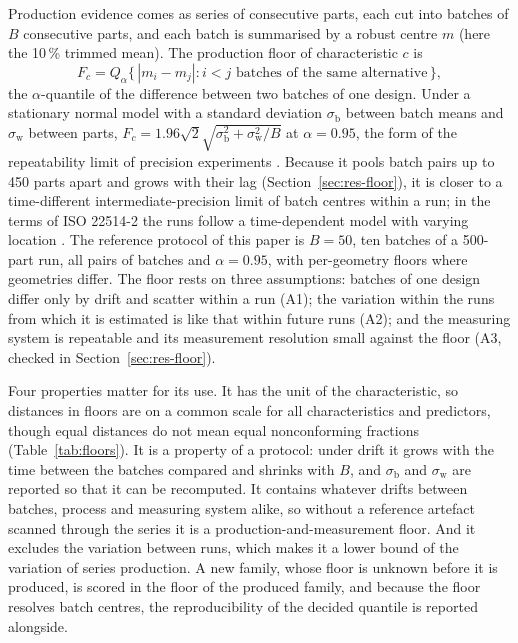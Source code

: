 \documentclass[pdflatex,sn-basic,lineno]{sn-jnl}
\begin{document}
Production evidence comes as series of consecutive parts, each cut into batches of $B$ consecutive parts, and each batch is summarised by a robust centre $m$ (here the 10\,\% trimmed mean). The production floor of characteristic $c$ is
\begin{equation}
F_c = Q_\alpha\bigl\{\,|m_i - m_j| : i< j \text{ batches of the same alternative}\,\bigr\},
\label{eq:floor}
\end{equation}
the $\alpha$-quantile of the difference between two batches of one design. Under a stationary normal model with a standard deviation $\sigma_\mathrm{b}$ between batch means and $\sigma_\mathrm{w}$ between parts, $F_c = 1.96\sqrt{2}\sqrt{\sigma_\mathrm{b}^2+\sigma_\mathrm{w}^2/B}$ at $\alpha=0.95$, the form of the repeatability limit of precision experiments \citep{iso2025repeatability}. Because it pools batch pairs up to 450 parts apart and grows with their lag (Section~\ref{sec:res-floor}), it is closer to a time-different intermediate-precision limit \citep{iso2023intermediate} of batch centres within a run; in the terms of ISO 22514-2 the runs follow a time-dependent model with varying location \citep{iso2026process}. The reference protocol of this paper is $B=50$, ten batches of a 500-part run, all pairs of batches and $\alpha=0.95$, with per-geometry floors where geometries differ. The floor rests on three assumptions: batches of one design differ only by drift and scatter within a run (A1); the variation within the runs from which it is estimated is like that within future runs (A2); and the measuring system is repeatable and its measurement resolution small against the floor (A3, checked in Section~\ref{sec:res-floor}).

Four properties matter for its use. It has the unit of the characteristic, so distances in floors are on a common scale for all characteristics and predictors, though equal distances do not mean equal nonconforming fractions (Table~\ref{tab:floors}). It is a property of a protocol: under drift it grows with the time between the batches compared and shrinks with $B$, and $\sigma_\mathrm{b}$ and $\sigma_\mathrm{w}$ are reported so that it can be recomputed. It contains whatever drifts between batches, process and measuring system alike, so without a reference artefact scanned through the series it is a production-and-measurement floor. And it excludes the variation between runs, which makes it a lower bound of the variation of series production. A new family, whose floor is unknown before it is produced, is scored in the floor of the produced family, and because the floor resolves batch centres, the reproducibility of the decided quantile is reported alongside.
\end{document}
